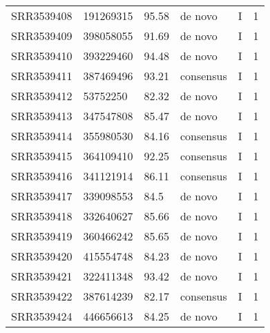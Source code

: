 \begin{longtable}{@{}llllll@{}}
SRR3539408 & 191269315     & 95.58       & de novo      & I        & 1        \\
SRR3539409 & 398058055     & 91.69       & de novo      & I        & 1        \\
SRR3539410 & 393229460     & 94.48       & de novo      & I        & 1        \\
SRR3539411 & 387469496     & 93.21       & consensus    & I        & 1        \\
SRR3539412 & 53752250      & 82.32       & de novo      & I        & 1        \\
SRR3539413 & 347547808     & 85.47       & de novo      & I        & 1        \\
SRR3539414 & 355980530     & 84.16       & consensus    & I        & 1        \\
SRR3539415 & 364109410     & 92.25       & consensus    & I        & 1        \\
SRR3539416 & 341121914     & 86.11       & consensus    & I        & 1        \\
SRR3539417 & 339098553     & 84.5        & de novo      & I        & 1        \\
SRR3539418 & 332640627     & 85.66       & de novo      & I        & 1        \\
SRR3539419 & 360466242     & 85.65       & de novo      & I        & 1        \\
SRR3539420 & 415554748     & 84.23       & de novo      & I        & 1        \\
SRR3539421 & 322411348     & 93.42       & de novo      & I        & 1        \\
SRR3539422 & 387614239     & 82.17       & consensus    & I        & 1        \\
SRR3539424 & 446656613     & 84.25       & de novo      & I        & 1       
\end{longtable}